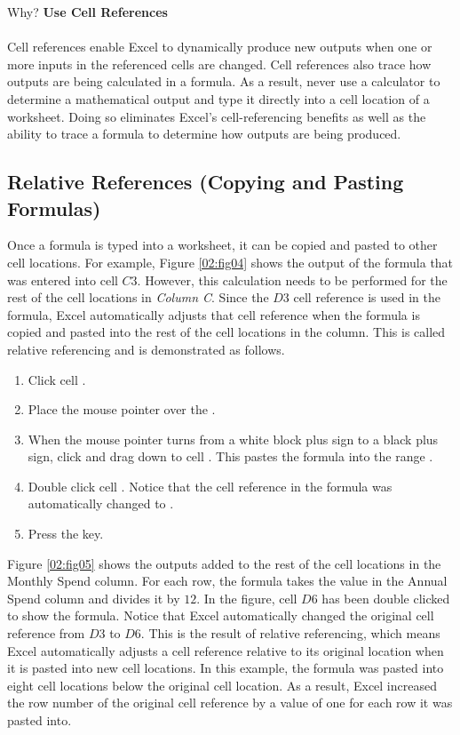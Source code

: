 \begin{center}
	\begin{infobox}{Why?}
		\textbf{Use Cell References}
		\\
		\\
		Cell references enable Excel to dynamically produce new outputs when one or more inputs in the referenced cells are changed. Cell references also trace how outputs are being calculated in a formula. As a result, never use a calculator to determine a mathematical output and type it directly into a cell location of a worksheet. Doing so eliminates Excel's cell-referencing benefits as well as the ability to trace a formula to determine how outputs are being produced.
	\end{infobox}
\end{center}

\subsection{Relative References (Copying and Pasting Formulas)}

Once a formula is typed into a worksheet, it can be copied and pasted to other cell locations. For example, Figure \ref{02:fig04} shows the output of the formula that was entered into cell $ C3 $. However, this calculation needs to be performed for the rest of the cell locations in \textit{Column C}. Since the $ D3 $ cell reference is used in the formula, Excel automatically adjusts that cell reference when the formula is copied and pasted into the rest of the cell locations in the column. This is called relative referencing and is demonstrated as follows.

\begin{enumerate}
	\item Click cell .
	\item Place the mouse pointer over the .
	\item When the mouse pointer turns from a white block plus sign to a black plus sign, click and drag down to cell . This pastes the formula into the range .
	\item Double click cell . Notice that the cell reference in the formula was automatically changed to .
	\item Press the  key.
\end{enumerate}

Figure \ref{02:fig05} shows the outputs added to the rest of the cell locations in the Monthly Spend column. For each row, the formula takes the value in the Annual Spend column and divides it by $ 12 $. In the figure, cell $ D6 $ has been double clicked to show the formula. Notice that Excel automatically changed the original cell reference from $ D3 $ to $ D6 $. This is the result of relative referencing, which means Excel automatically adjusts a cell reference relative to its original location when it is pasted into new cell locations. In this example, the formula was pasted into eight cell locations below the original cell location. As a result, Excel increased the row number of the original cell reference by a value of one for each row it was pasted into.

